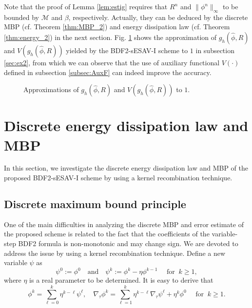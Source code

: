 \documentclass{m2an}
\begin{document}
\begin{rmrk}
	Note that the proof of Lemma \ref{lem:estig}  requires that $ R^{n} $ and $ \| \phi^{n} \|_{\infty} $ to be bounded by $ \mathcal{M} $ and $ \beta $, respectively. Actually, they can be deduced by the discrete MBP (cf. Theorem \ref{thm:MBP_2}) and energy dissipation law (cf. Theorem \ref{thm:energy_2}) in the next section. Fig. \ref{figAV} shows the approximation of $ g_h(\hat{\phi}, R) $ and $ V ( g_h(\hat{\phi}, R) ) $ yielded by the BDF2-sESAV-I scheme to $1$ in subsection \ref{sec:ex2}, from which we can observe that the use of auxiliary functional $ V( \cdot ) $ defined in subsection \ref{subsec:AuxF} can indeed improve the accuracy.
	\begin{figure}[!htbp]
		\vspace{-12pt}
		\centering
		\setlength{\abovecaptionskip}{0.0cm} 
		\setlength{\belowcaptionskip}{0.0cm}
		\caption{Approximations of $ g_h(\hat{\phi}, R) $ and $ V ( g_h(\hat{\phi}, R) ) $ to $1$.}	
		\label{figAV}
	\end{figure}
	\vspace{-8pt}
\end{rmrk}

\section{Discrete energy dissipation law and MBP}\label{sec:ED_MBP}
In this section, we investigate the discrete energy dissipation law and MBP of the proposed BDF2-sESAV-I scheme by using a kernel recombination technique.

\subsection{Discrete maximum bound principle}\label{subsec:mbp}
One of the main difficulties in analyzing the discrete MBP and error estimate of the proposed scheme is related to the fact that the coefficients of the variable-step BDF2 formula is non-monotonic and may change sign. We are devoted to address the issue by using a kernel recombination technique. Define a new variable $ \psi $ as
\begin{equation*}\label{def:new_ker}
	\psi^{0} := \phi^0 \quad \text{and} \quad \psi^{k} := \phi^{k} - \eta \phi^{k-1} \quad   \text{  for  } \  k \geq 1,
\end{equation*}
where $\eta$ is a real parameter to be determined. It is easy to derive that
\begin{equation}\label{new_ker:f1}
	\phi^{k} = \sum_{\ell=0}^{k} \eta^{k-\ell} \psi^\ell, \quad \nabla_\tau \phi^{k} = \sum_{\ell=1}^k \eta^{k-\ell} \nabla_\tau \psi^{\ell} + \eta^{k} \phi^0 \quad   \text{  for  } \  k \geq 1.
\end{equation}
\end{document}
